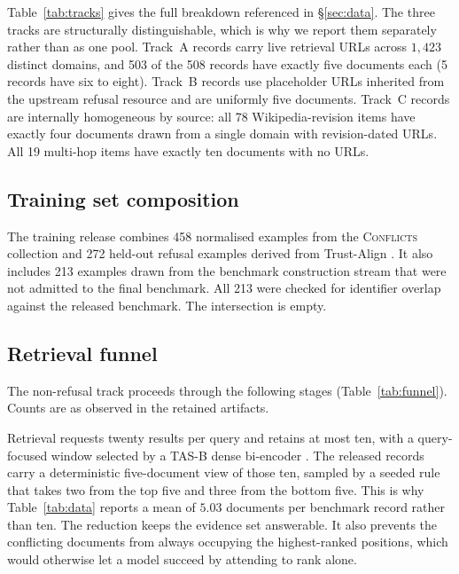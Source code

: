 Table~\ref{tab:tracks} gives the full breakdown referenced in
\S\ref{sec:data}. The three tracks are structurally distinguishable, which is
why we report them separately rather than as one pool. Track~A records carry
live retrieval URLs across $1{,}423$ distinct domains, and 503 of the 508
records have exactly five documents each (5 records have six to eight).
Track~B records use placeholder URLs inherited from the upstream refusal
resource and are uniformly five documents. Track~C records are internally
homogeneous by source: all 78 Wikipedia-revision items have exactly four
documents drawn from a single domain with revision-dated URLs. All 19
multi-hop items have exactly ten documents with no URLs.

\subsection{Training set composition}

The training release combines 458 normalised examples from the
\textsc{Conflicts} collection \citep{cattan2025dragged} and 272 held-out refusal
examples derived from Trust-Align \citep{song2025trustalign}. It also includes 213 examples
drawn from the benchmark construction stream that were not admitted to the
final benchmark. All 213 were checked for identifier overlap against the
released benchmark. The intersection is empty.

\subsection{Retrieval funnel}

The non-refusal track proceeds through the following stages
(Table~\ref{tab:funnel}). Counts are as observed in the retained artifacts.

Retrieval requests twenty results per query and retains at most ten, with a
query-focused window selected by a TAS-B dense bi-encoder
\citep{hofstatter2021tasb}. The released records carry a deterministic
five-document view of those ten, sampled by a seeded rule that takes two from
the top five and three from the bottom five. This is why Table~\ref{tab:data}
reports a mean of $5.03$ documents per benchmark record rather than ten. The
reduction keeps the evidence set answerable. It also prevents the conflicting
documents from always occupying the highest-ranked positions, which would
otherwise let a model succeed by attending to rank alone.


